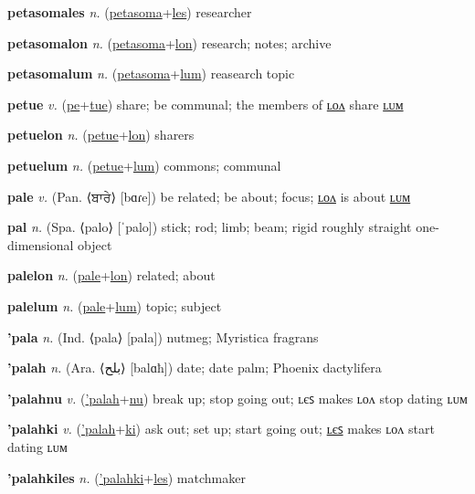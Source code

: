 \textbf{\hypertarget{petasomales}{petasomales}} \textit{n.} (\hyperlink{petasoma}{petasoma}+\allowbreak \hyperlink{les}{les})
researcher

\textbf{\hypertarget{petasomalon}{petasomalon}} \textit{n.} (\hyperlink{petasoma}{petasoma}+\allowbreak \hyperlink{lon}{lon})
research; notes; archive

\textbf{\hypertarget{petasomalum}{petasomalum}} \textit{n.} (\hyperlink{petasoma}{petasoma}+\allowbreak \hyperlink{lum}{lum})
reasearch topic

\textbf{\hypertarget{petue}{petue}} \textit{v.} (\hyperlink{pe}{pe}+\allowbreak \hyperlink{tue}{tue})
share; be communal; the members of \hyperlink{petuelon}{ʟᴏᴧ} share \hyperlink{petuelum}{ʟᴜᴍ}

\textbf{\hypertarget{petuelon}{petuelon}} \textit{n.} (\hyperlink{petue}{petue}+\allowbreak \hyperlink{lon}{lon})
sharers

\textbf{\hypertarget{petuelum}{petuelum}} \textit{n.} (\hyperlink{petue}{petue}+\allowbreak \hyperlink{lum}{lum})
commons; communal

\textbf{\hypertarget{pale}{pale}} \textit{v.} (Pan. ⟨{\gurmukhi{}ਬਾਰੇ}⟩ [bɑɾe])
be related; be about; focus; \hyperlink{palelon}{ʟᴏᴧ} is about \hyperlink{palelum}{ʟᴜᴍ}

\textbf{\hypertarget{pal}{pal}} \textit{n.} (Spa. ⟨palo⟩ [ˈpalo])
stick; rod; limb; beam; rigid roughly straight one-dimensional object

\textbf{\hypertarget{palelon}{palelon}} \textit{n.} (\hyperlink{pale}{pale}+\allowbreak \hyperlink{lon}{lon})
related; about

\textbf{\hypertarget{palelum}{palelum}} \textit{n.} (\hyperlink{pale}{pale}+\allowbreak \hyperlink{lum}{lum})
topic; subject

\textbf{\hypertarget{'pala}{'pala}} \textit{n.} (Ind. ⟨pala⟩ [pala])
nutmeg; Myristica fragrans

\textbf{\hypertarget{'palah}{'palah}} \textit{n.} (Ara. ⟨{\arabics{}بلح}⟩ [balɑħ])
date; date palm; Phoenix dactylifera

\textbf{\hypertarget{'palahnu}{'palahnu}} \textit{v.} (\hyperlink{'palah}{'palah}+\allowbreak \hyperlink{nu}{nu})
break up; stop going out; ʟєꜱ makes ʟᴏᴧ stop dating ʟᴜᴍ

\textbf{\hypertarget{'palahki}{'palahki}} \textit{v.} (\hyperlink{'palah}{'palah}+\allowbreak \hyperlink{ki}{ki})
ask out; set up; start going out; \hyperlink{'palahkiles}{ʟєꜱ} makes ʟᴏᴧ start dating ʟᴜᴍ

\textbf{\hypertarget{'palahkiles}{'palahkiles}} \textit{n.} (\hyperlink{'palahki}{'palahki}+\allowbreak \hyperlink{les}{les})
matchmaker

